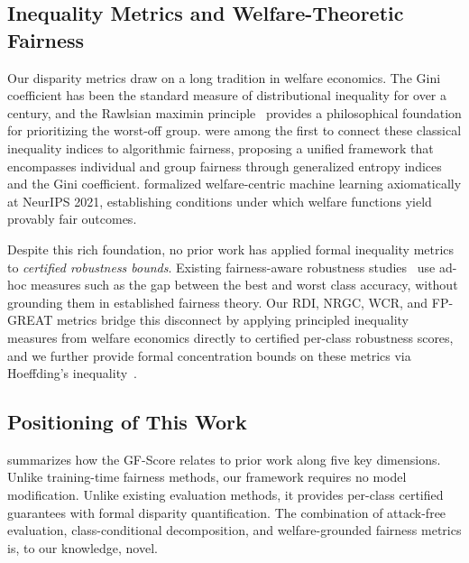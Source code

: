 \subsection{Inequality Metrics and Welfare-Theoretic Fairness}
\label{sec:rw_inequality}

Our disparity metrics draw on a long tradition in welfare economics. The Gini coefficient has been the standard measure of distributional inequality for over a century, and the Rawlsian maximin principle~\citep{rawls1971theory} provides a philosophical foundation for prioritizing the worst-off group. \citet{Speicher_2018} were among the first to connect these classical inequality indices to algorithmic fairness, proposing a unified framework that encompasses individual and group fairness through generalized entropy indices and the Gini coefficient. \citet{cousins2021axiomatictheoryprovablyfairwelfarecentric} formalized welfare-centric machine learning axiomatically at NeurIPS 2021, establishing conditions under which welfare functions yield provably fair outcomes.

Despite this rich foundation, no prior work has applied formal inequality metrics to \emph{certified robustness bounds}. Existing fairness-aware robustness studies~\citep{xu2021robustfairfairnessadversarial, wei2023cfaclasswisecalibratedfair, zhang2024fairnessawareadversariallearning} use ad-hoc measures such as the gap between the best and worst class accuracy, without grounding them in established fairness theory. Our RDI, NRGC, WCR, and FP-GREAT metrics bridge this disconnect by applying principled inequality measures from welfare economics directly to certified per-class robustness scores, and we further provide formal concentration bounds on these metrics via Hoeffding's inequality~\citep{Hoeffding1963-sq}.

\subsection{Positioning of This Work}

 summarizes how the GF-Score relates to prior work along five key dimensions. Unlike training-time fairness methods, our framework requires no model modification. Unlike existing evaluation methods, it provides per-class certified guarantees with formal disparity quantification. The combination of attack-free evaluation, class-conditional decomposition, and welfare-grounded fairness metrics is, to our knowledge, novel.

